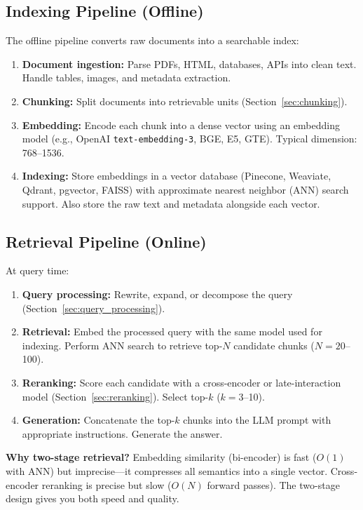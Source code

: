 \subsection{Indexing Pipeline (Offline)}

The offline pipeline converts raw documents into a searchable index:

\begin{enumerate}
    \item \textbf{Document ingestion:} Parse PDFs, HTML, databases, APIs into clean text. Handle tables, images, and metadata extraction.
    \item \textbf{Chunking:} Split documents into retrievable units (Section~\ref{sec:chunking}).
    \item \textbf{Embedding:} Encode each chunk into a dense vector using an embedding model (e.g., OpenAI \texttt{text-embedding-3}, BGE, E5, GTE). Typical dimension: 768--1536.
    \item \textbf{Indexing:} Store embeddings in a vector database (Pinecone, Weaviate, Qdrant, pgvector, FAISS) with approximate nearest neighbor (ANN) search support. Also store the raw text and metadata alongside each vector.
\end{enumerate}

\subsection{Retrieval Pipeline (Online)}

At query time:
\begin{enumerate}
    \item \textbf{Query processing:} Rewrite, expand, or decompose the query (Section~\ref{sec:query_processing}).
    \item \textbf{Retrieval:} Embed the processed query with the same model used for indexing. Perform ANN search to retrieve top-$N$ candidate chunks ($N = 20$--100).
    \item \textbf{Reranking:} Score each candidate with a cross-encoder or late-interaction model (Section~\ref{sec:reranking}). Select top-$k$ ($k = 3$--10).
    \item \textbf{Generation:} Concatenate the top-$k$ chunks into the LLM prompt with appropriate instructions. Generate the answer.
\end{enumerate}

\textbf{Why two-stage retrieval?} Embedding similarity (bi-encoder) is fast ($O(1)$ with ANN) but imprecise---it compresses all semantics into a single vector. Cross-encoder reranking is precise but slow ($O(N)$ forward passes). The two-stage design gives you both speed and quality.

